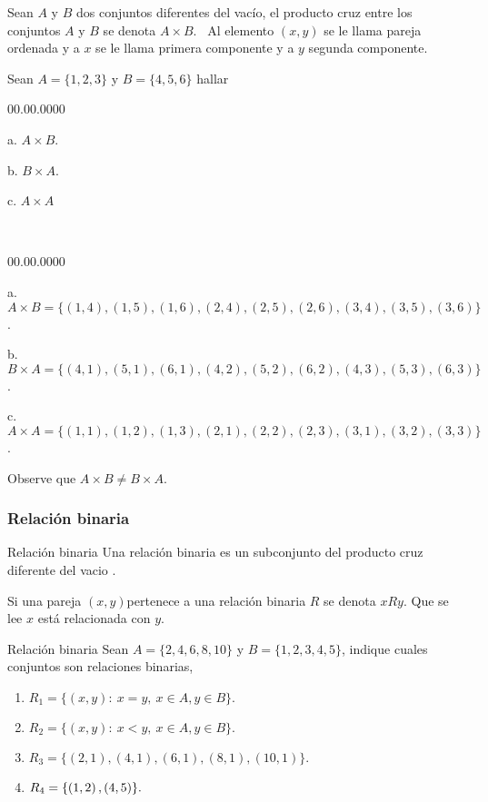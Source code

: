 \notacion Sean $A$ y $B$ dos conjuntos diferentes del vacío, el
producto cruz entre los conjuntos $A$ y $B$ se denota $A\times B.$
\nota\ Al elemento $\left(x,y\right)$ se le llama pareja ordenada
y a $x$ se le llama primera componente y a $y$ segunda componente.

\begin{ejem}{} Sean $A=\{1,2,3\}$ y $B=\{4,5,6\}$ hallar 
\begin{lyxlist}{00.00.0000}
\item [{a.}] $A\times B.$
\item [{b.}] $B\times A.$
\item [{c.}] $A\times A$
\end{lyxlist}
\end{ejem}

\solucion\ 
\begin{lyxlist}{00.00.0000}
\item [{a.}] $A\times B=\{\left(1,4\right),\left(1,5\right),\left(1,6\right),\left(2,4\right),\left(2,5\right),\left(2,6\right),\left(3,4\right),\left(3,5\right),\left(3,6\right)\}$.
\item [{b.}] $B\times A=\{\left(4,1\right),\left(5,1\right),\left(6,1\right),\left(4,2\right),\left(5,2\right),\left(6,2\right),\left(4,3\right),\left(5,3\right),\left(6,3\right)\}$.
\item [{c.}] $A\times A=\{\left(1,1\right),\left(1,2\right),\left(1,3\right),\left(2,1\right),\left(2,2\right),\left(2,3\right),\left(3,1\right),\left(3,2\right),\left(3,3\right)\}$.
\end{lyxlist}
Observe que $A\times B\neq B\times A.$


\subsubsection{Relación binaria}

\begin{definicionn}{Relación binaria} Una relación binaria es un
subconjunto del producto cruz diferente del vacio . \end{definicionn}

\notacion Si una pareja $\left(x,y\right)$pertenece a una relación
binaria $R$ se denota $xRy.$ Que se lee $x$ está relacionada con
$y.$

\begin{ejem}{ Relación binaria} Sean $A=\{2,4,6,8,10\}$ y $B=\{1,2,3,4,5\}$,
indique cuales conjuntos son relaciones binarias,
\begin{enumerate}
\item $R_{1}=\{\left(x,y\right):\: x=y,\: x\in A,y\in B\}.$
\item $R_{2}=\{\left(x,y\right):\: x<y,\: x\in A,y\in B\}.$
\item $R_{3}=\{\left(2,1\right),\left(4,1\right),\left(6,1\right),\left(8,1\right),\left(10,1\right)\}.$
\item $R_{4}=\{\left(1,2\right),\mbox{\mbox{\ensuremath{\left(4,5\right)}}}\}.$
\end{enumerate}
\end{ejem}

